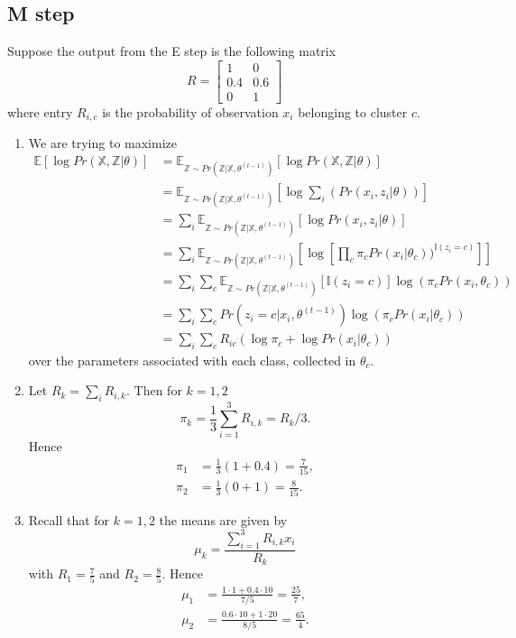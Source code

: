 \documentclass{article}
\newcommand{\bbm}{\begin{bmatrix}}
\newcommand{\ebm}{\end{bmatrix}}
\newcommand{\X}{\mathbb{X}}
\newcommand{\Z}{\mathbb{Z}}
\begin{document}
\subsection{M step}
Suppose the output from the E step is the following matrix
\[
    R = \bbm 1 & 0 \\ 0.4 &0.6 \\ 0 & 1 \ebm
\]
where entry $R_{i,c}$ is the probability of observation $x_i$ belonging to cluster $c$.
\begin{enumerate}
    \item We are trying to maximize
    \begin{align*}
        \mathbb{E}[\log Pr(\mathbb{X},\Z|\theta)] &=\mathbb{E}_{\Z\sim Pr(\Z|\X,\theta^{(t-1)})}\left[\log Pr(\X,\Z|\theta) \right]\\
        &=\mathbb{E}_{\Z\sim Pr(\Z|\X,\theta^{(t-1)})}\left[\log \sum_i\left(Pr(x_i,z_i|\theta) \right) \right]\\
        &=\sum_i\mathbb{E}_{\Z\sim Pr(\Z|\X,\theta^{(t-1)})}\left[ \log Pr(x_i,z_i|\theta)\right]\\
        &=\sum_i\mathbb{E}_{\Z\sim Pr(\Z|\X,\theta^{(t-1)})}\left[\log\left[\prod_{c} \pi_cPr(x_i|\theta_c))^{\mathbb{I}(z_i=c)}\right]\right] \\ 
        &= \sum_i\sum_{c}\mathbb{E}_{\Z\sim Pr(\Z|\X,\theta^{(t-1)})}[\mathbb{I}(z_i=c)]\log(\pi_c Pr(x_i,\theta_c))\\
        &=\sum_i\sum_cPr(z_i=c|x_i,\theta^{(t-1)})\log(\pi_cPr(x_i|\theta_c))\\
        &= \sum_i\sum_cR_{ic}(\log\pi_c + \log Pr(x_i|\theta_c))
    \end{align*}
    over the parameters associated with each class, collected in $\theta_c$. 
    \item Let $R_k = \sum_i R_{i,k}$. Then for $k=1,2$
    \[
        \pi_k = \frac13\sum^3_{i=1}R_{i,k} = R_k / 3.
    \]
    Hence
    \begin{align*}
        \pi_1 &= \frac13(1+0.4)=\frac{7}{15},\\
        \pi_2 &= \frac13(0+1) = \frac{8}{15}.
    \end{align*}
    \item Recall that for $k=1,2$ the means are given by
    \[
        \mu_k = \frac{\sum_{i=1}^3R_{i,k}x_i}{R_k}
    \]
    with $R_1=\tfrac{7}{5}$ and $R_2=\tfrac{8}{5}$. Hence
    \begin{align*}
        \mu_1 &= \frac{1\cdot 1+0.4\cdot10}{7/5} = \frac{25}{7},\\
        \mu_2 &= \frac{0.6\cdot10+1\cdot20}{8/5} = \frac{65}{4}.

\end{align*}
\end{enumerate}
\end{document}
